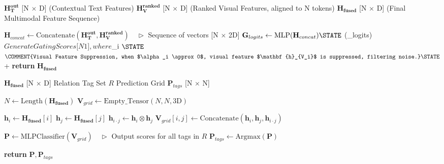 \documentclass[12pt]{article}
\begin{document}
\begin{algorithm}
\caption{Smart Modality Gating Fusion}
\label{alg:module3}
\begin{algorithmic}[1]
\REQUIRE $\mathbf{H_{T}^{out}}$ [N $\times$ D] (Contextual Text Features)
\REQUIRE $\mathbf{H_{V}^{ranked}}$ [N $\times$ D] (Ranked Visual Features, aligned to N tokens)
\ENSURE $\mathbf{H_{fused}}$ [N $\times$ D] (Final Multimodal Feature Sequence)

\vspace{0.5cm}
\STATE $\mathbf{H}_{concat} \leftarrow \text{Concatenate}(\mathbf{H_{T}^{out}}, \mathbf{H_{V}^{ranked}}) \quad \triangleright$ Sequence of vectors [N $\times$ 2D]
\STATE $\mathbf{G}_{logits} \leftarrow \text{MLP}(\mathbf{H}_{concat}) 
\STATE $\mathbf{\alpha} \leftarrow {}(_{logits}) \quad \triangleright$ Generate Gating Scores [N $\times$ 1], where $\alpha_i \in [0, 1]$

\STATE $ \leftarrow {} \otimes \mathbf{\alpha} \quad \triangleright$ \COMMENT{Visual Feature Suppression, when $\alpha_i \approx 0$, visual feature $\mathbf{h}_{V_i}$ is suppressed, filtering noise.}

\STATE $ \leftarrow {} + 
\STATE \textbf{return} $\mathbf{H_{fused}}$
\end{algorithmic}
\end{algorithm}



\begin{algorithm}
\caption{Module IV-A: Grid Feature Construction and Classification}
\label{alg:module4a}
\begin{algorithmic}[1]
\REQUIRE $\mathbf{H_{fused}}$ [N $\times$ D] 
\REQUIRE Relation Tag Set $R$ 
\ENSURE Prediction Grid $\mathbf{P}_{tags}$ [N $\times$ N] 

\vspace{0.5cm}
\STATE $N \leftarrow \text{Length}(\mathbf{H_{fused}})$
\STATE $\mathbf{V}_{grid} \leftarrow \text{Empty\_Tensor}(N, N, \text{3D})$

        \STATE $\mathbf{h}_i \leftarrow \mathbf{H_{fused}}[i]$
        \STATE $\mathbf{h}_j \leftarrow \mathbf{H_{fused}}[j]$
        \STATE $\mathbf{h}_{i \cdot j} \leftarrow \mathbf{h}_i \otimes \mathbf{h}_j$ 
        \STATE $\mathbf{V}_{grid}[i, j] \leftarrow \text{Concatenate}(\mathbf{h}_i, \mathbf{h}_j, \mathbf{h}_{i \cdot j})$
    \ENDFOR
\ENDFOR

\STATE $\mathbf{P} \leftarrow \text{MLPClassifier}(\mathbf{V}_{grid}) \quad \triangleright$ Output scores for all tags in $R$
\STATE $\mathbf{P}_{tags} \leftarrow \text{Argmax}(\mathbf{P})$ 

\STATE \textbf{return} $\mathbf{P}, \mathbf{P}_{tags}$
\end{algorithmic}
\end{algorithm}
\end{document}
